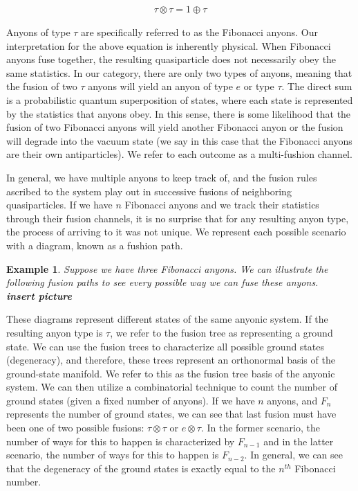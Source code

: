 \documentclass[10pt]{ucthesis}
\newtheorem{example}[definition]{Example}
\begin{document}
\begin{equation}
	\begin{aligned}
		\tau \otimes \tau = 1\oplus \tau
	\end{aligned}
\end{equation}

Anyons of type $\tau$ are specifically referred to as the Fibonacci anyons. Our interpretation for the above equation is inherently physical. When Fibonacci anyons fuse together, the resulting quasiparticle does not necessarily obey the same statistics. In our category, there are only two types of anyons, meaning that the fusion of two $\tau$ anyons will yield an anyon of type $e$ or type $\tau$. The direct sum is a probabilistic quantum superposition of states, where each state is represented by the statistics that anyons obey. In this sense, there is some likelihood that the fusion of two Fibonacci anyons will yield another Fibonacci anyon or the fusion will degrade into the vacuum state (we say in this case that the Fibonacci anyons are their own antiparticles). We refer to each outcome as a multi-fushion channel.

In general, we have multiple anyons to keep track of, and the fusion rules ascribed to the system play out in successive fusions of neighboring quasiparticles. If we have $n$ Fibonacci anyons and we track their statistics through their fusion channels, it is no surprise that for any resulting anyon type, the process of arriving to it was not unique. We represent each possible scenario with a diagram, known as a fushion path.

\begin{example}
Suppose we have three Fibonacci anyons. We can illustrate the following fusion paths to see every possible way we can fuse these anyons.\\
\textbf{insert picture}
\end{example} 

These diagrams represent different states of the same anyonic system. If the resulting anyon type is $\tau$, we refer to the fusion tree as representing a ground state. We can use the fusion trees to characterize all possible ground states (degeneracy), and therefore, these trees represent an orthonormal basis of the ground-state manifold\cite{Trebst}. We refer to this as the fusion tree basis of the anyonic system. We can then utilize a combinatorial technique to count the number of ground states (given a fixed number of anyons). If we have $n$ anyons, and $F_n$ represents the number of ground states, we can see that last fusion must have been one of two possible fusions: $\tau\otimes \tau$ or $e \otimes \tau$. In the former scenario, the number of ways for this to happen is characterized by $F_{n-1}$ and in the latter scenario, the number of ways for this to happen is $F_{n-2}$. In general, we can see that the degeneracy of the ground states is exactly equal to the $n^{th}$ Fibonacci number.
\end{document}
